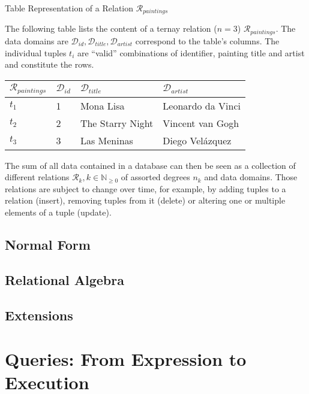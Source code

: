 \begin{example}[label=example:relational_table]{Table Representation of a Relation $\mathcal{R}_{paintings}$}{}
    
The following table lists the content of a ternay relation ($n = 3$) $\mathcal{R}_{paintings}$. The data domains are $\mathcal{D}_{id}, \mathcal{D}_{title}, \mathcal{D}_{artist}$ correspond to the table's columns. The individual tuples $t_i$ are ``valid'' combinations of identifier, painting title and artist and constitute the rows.
    
    \begin{center}
        \begin{tabular}{ l || l | l | l |}
         $\mathcal{R}_{paintings}$ & $\mathcal{D}_{id}$ & $\mathcal{D}_{title}$  & $\mathcal{D}_{artist}$ \\ 
         \hline
         \hline
         $t_1$ &  1 & Mona Lisa &  Leonardo da Vinci \\
         \hline
         $t_2$ &  2 & The Starry Night & Vincent van Gogh \\
         \hline
         $t_3$ &  3 & Las Meninas & Diego Velázquez \\
         \hline
        \end{tabular}
    \end{center}
\end{example}


The sum of all data contained in a database can then be seen as a collection of different relations $\mathcal{R}_k, k \in \mathbb{N}_{\geq 0}$ of assorted degrees $n_k$ and data domains. Those relations are subject to change over time, for example, by adding tuples to a relation (insert), removing tuples from it (delete) or altering one or multiple elements of a tuple (update).

\subsection{Normal Form}

\subsection{Relational Algebra}

\subsection{Extensions}

\section{Queries: From Expression to Execution}

